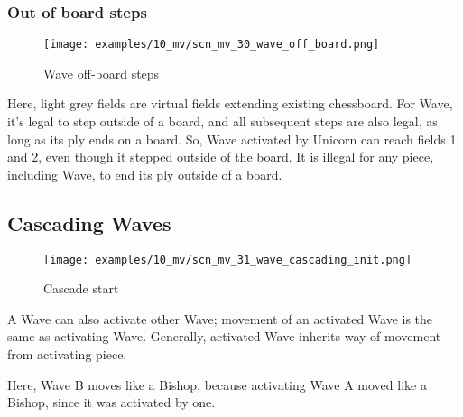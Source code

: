 \clearpage %

\subsubsection*{Out of board steps}
\label{sec:Miranda's veil/Wave/Movement/Out of board steps}

\vspace*{-1.4\baselineskip}
\noindent
\begin{figure}[!h]
\texttt{[image: examples/10\_mv/scn\_mv\_30\_wave\_off\_board.png]}
\caption{Wave off-board steps}
\label{fig:scn_mv_30_wave_off_board}
\end{figure}

Here, light grey fields are virtual fields extending existing chessboard.
For Wave, it's legal to step outside of a board, and all subsequent steps
are also legal, as long as its ply ends on a board. So, Wave activated by
Unicorn can reach fields 1 and 2, even though it stepped outside of the
board. It is illegal for any piece, including Wave, to end its ply outside
of a board.

\clearpage %

\subsection*{Cascading Waves}
\label{sec:Miranda's veil/Wave/Cascading Waves}

\vspace*{-1.4\baselineskip}
\noindent
\begin{figure}[h]
\texttt{[image: examples/10\_mv/scn\_mv\_31\_wave\_cascading\_init.png]}
\caption{Cascade start}
\label{fig:scn_mv_31_wave_cascading_init}
\end{figure}

A Wave can also activate other Wave; movement of an activated Wave is the same as
activating Wave. Generally, activated Wave inherits way of movement from activating
piece.

Here, Wave B moves like a Bishop, because activating Wave A moved like a Bishop,
since it was activated by one.

